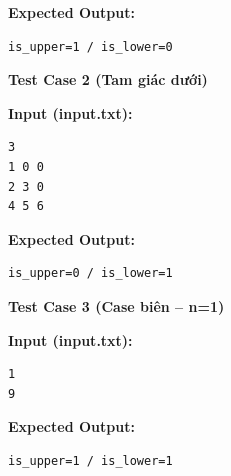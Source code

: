 \textbf{Expected Output:}
\begin{lstlisting}
is_upper=1 / is_lower=0
\end{lstlisting}

\vspace{0.5cm}

\textbf{Test Case 2 (Tam giác dưới)}

\textbf{Input (input.txt):}
\begin{lstlisting}
3
1 0 0
2 3 0
4 5 6
\end{lstlisting}

\textbf{Expected Output:}
\begin{lstlisting}
is_upper=0 / is_lower=1
\end{lstlisting}

\vspace{0.5cm}

\textbf{Test Case 3 (Case biên -- n=1)}

\textbf{Input (input.txt):}
\begin{lstlisting}
1
9
\end{lstlisting}

\textbf{Expected Output:}
\begin{lstlisting}
is_upper=1 / is_lower=1
\end{lstlisting}